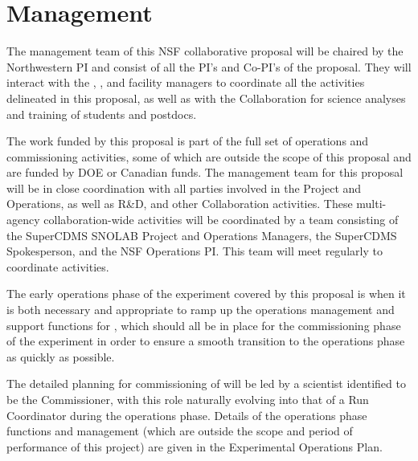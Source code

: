 \section{Management}
\label{sec:management}

The management team of this NSF collaborative proposal will be chaired by the Northwestern PI and consist of all the PI's and Co-PI's of the proposal.  They will interact with the \nexus, \cute, and \SNOLAB facility managers to coordinate all the activities delineated in this proposal, as well as with the \SuperCDMS Collaboration for science analyses and training of students and postdocs.

The work funded by this proposal is part of the full set of \scs operations and commissioning activities, some of which are outside the scope of this proposal and are funded by DOE or Canadian funds. The management team for this proposal will be in close coordination with all parties involved in the \scs Project and Operations, as well as R\&D, and other \SuperCDMS Collaboration activities. These multi-agency collaboration-wide activities will be coordinated by a team consisting of the SuperCDMS SNOLAB Project and Operations Managers, the SuperCDMS Spokesperson, and the NSF Operations PI. This team will meet regularly to coordinate activities. 

The early operations phase of the \scs experiment covered by this proposal is when it is both necessary and appropriate to ramp up the operations management and support functions for \scs, which should all be in place for the commissioning phase of the experiment in order to ensure a smooth transition to the operations phase as quickly as possible.

The detailed planning for commissioning of \scs will be led by a scientist identified to be the \scs Commissioner, with this role naturally evolving into that of a Run Coordinator during the operations phase. Details of the operations phase functions and management (which are outside the scope and period of performance of this project) are given in the \scs Experimental Operations Plan.
  
